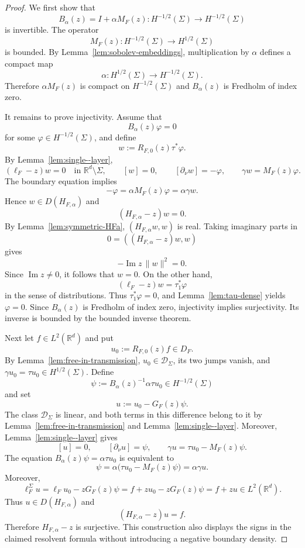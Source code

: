 \documentclass[a4paper,11pt]{article}
\numberwithin{equation}{section}
\theoremstyle{remark}
\theoremstyle{definition}
\theoremstyle{remark}
\begin{document}
\begin{proof}
We first show that
$$
B_\alpha(z)=I+\alpha M_F(z):H^{-1/2}(\Sigma)
\to H^{-1/2}(\Sigma)
$$
is invertible.
The operator
$$
M_F(z):H^{-1/2}(\Sigma)\to H^{1/2}(\Sigma)
$$
is bounded.
By Lemma~\ref{lem:sobolev-embeddings}, multiplication by $\alpha$ defines a compact map
$$
\alpha:H^{1/2}(\Sigma)\to H^{-1/2}(\Sigma).
$$
Therefore $\alpha M_F(z)$ is compact on $H^{-1/2}(\Sigma)$ and $B_\alpha(z)$ is Fredholm of index zero.

It remains to prove injectivity.
Assume that
$$
B_\alpha(z)\varphi=0
$$
for some $\varphi\in H^{-1/2}(\Sigma)$, and define
$$
w:=R_{F,0}(z)\tau^*\varphi.
$$
By Lemma~\ref{lem:single--layer},
$$
(\ell_F-z)w=0
\quad\text{in }\mathbb R^d\setminus\Sigma,
\qquad
[w]=0,
\qquad
[\partial_\nu w]=-\varphi,
\qquad
\gamma w=M_F(z)\varphi.
$$
The boundary equation implies
$$
-\varphi=\alpha M_F(z)\varphi=\alpha\gamma w.
$$
Hence $w\in D(H_{F,\alpha})$ and
$$
(H_{F,\alpha}-z)w=0.
$$
By Lemma~\ref{lem:symmetric-HFa}, $(H_{F,\alpha}w,w)$ is real.
Taking imaginary parts in
$$
0=((H_{F,\alpha}-z)w,w)
$$
gives
$$
-\operatorname{Im}z\,\|w\|^2=0.
$$
Since $\operatorname{Im}z\ne0$, it follows that $w=0$.
On the other hand,
$$
(\ell_F-z)w=\tau_1^*\varphi
$$
in the sense of distributions.
Thus $\tau_1^*\varphi=0$, and Lemma~\ref{lem:tau-dense} yields $\varphi=0$.
Since $B_\alpha(z)$ is Fredholm of index zero, injectivity implies surjectivity.
Its inverse is bounded by the bounded inverse theorem.

Next let $f\in L^2(\mathbb R^d)$ and put
$$
u_0:=R_{F,0}(z)f\in D_F.
$$
By Lemma~\ref{lem:free-in-transmission}, $u_0\in\mathcal D_\Sigma$, its two jumps vanish, and $\gamma u_0=\tau u_0\in H^{1/2}(\Sigma)$.
Define
$$
\psi:=B_\alpha(z)^{-1}\alpha\tau u_0
\in H^{-1/2}(\Sigma)
$$
and set
$$
u:=u_0-G_F(z)\psi.
$$
The class $\mathcal D_\Sigma$ is linear, and both terms in this difference belong to it by Lemma~\ref{lem:free-in-transmission} and Lemma~\ref{lem:single--layer}.
Moreover, Lemma~\ref{lem:single--layer} gives
$$
[u]=0,
\qquad
[\partial_\nu u]=\psi,
\qquad
\gamma u=\tau u_0-M_F(z)\psi.
$$
The equation $B_\alpha(z)\psi=\alpha\tau u_0$ is equivalent to
$$
\psi
=\alpha\bigl(\tau u_0-M_F(z)\psi\bigr)
=\alpha\gamma u.
$$
Moreover,
$$
\ell_F^\Sigma u
=
\ell_Fu_0-zG_F(z)\psi
=
f+zu_0-zG_F(z)\psi
=
f+zu
\in L^2(\mathbb R^d).
$$
Thus $u\in D(H_{F,\alpha})$ and
$$
(H_{F,\alpha}-z)u=f.
$$
Therefore $H_{F,\alpha}-z$ is surjective.
This construction also displays the signs in the claimed resolvent formula without introducing a negative boundary density.


\end{proof}
\end{document}
